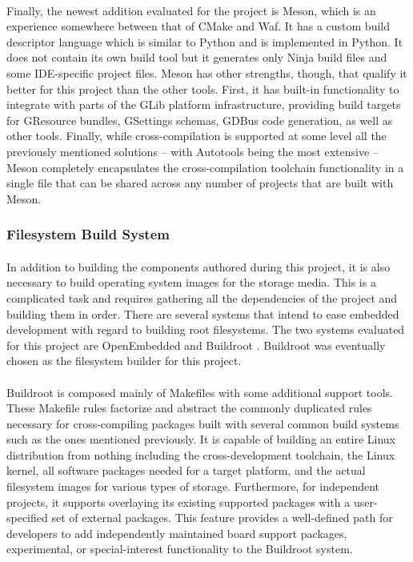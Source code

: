 \paragraph{}
Finally, the newest addition evaluated for the project is Meson, which is an experience somewhere between that of CMake and Waf.
It has a custom build descriptor language which is similar to Python and is implemented in Python.
It does not contain its own build tool but it generates only Ninja build files and some IDE-specific project files.
Meson has other strengths, though, that qualify it better for this project than the other tools.
First, it has built-in functionality to integrate with parts of the GLib platform infrastructure, providing build targets for GResource bundles, GSettings schemas, GDBus code generation, as well as other tools.
Finally, while cross-compilation is supported at some level all the previously mentioned solutions -- with Autotools being the most extensive -- Meson completely encapsulates the cross-compilation toolchain functionality in a single file that can be shared across any number of projects that are built with Meson.

\subsubsection{Filesystem Build System}

\paragraph{}
In addition to building the components authored during this project, it is also necessary to build operating system images for the storage media.
This is a complicated task and requires gathering all the dependencies of the project and building them in order.
There are several systems that intend to ease embedded development with regard to building root filesystems.
The two systems evaluated for this project are OpenEmbedded \cite{oe-home} and Buildroot \cite{buildroot-home}.
Buildroot was eventually chosen as the filesystem builder for this project.

\paragraph{}
Buildroot is composed mainly of Makefiles with some additional support tools.
These Makefile rules factorize and abstract the commonly duplicated rules necessary for cross-compiling packages built with several common build systems such as the ones mentioned previously.
It is capable of building an entire Linux distribution from nothing including the cross-development toolchain, the Linux kernel, all software packages needed for a target platform, and the actual filesystem images for various types of storage.
Furthermore, for independent projects, it supports overlaying its existing supported packages with a user-specified set of external packages.
This feature provides a well-defined path for developers to add independently maintained board support packages, experimental, or special-interest functionality to the Buildroot system.

